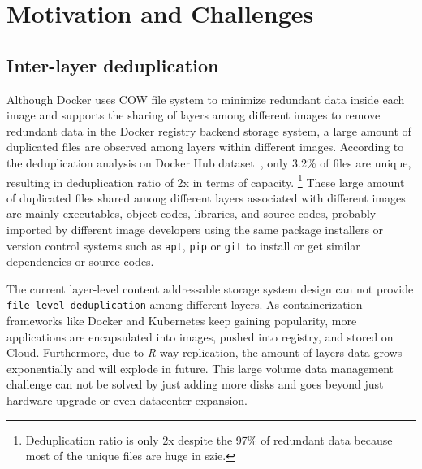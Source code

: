 \section{Motivation and Challenges}
\label{sec:dataset-analysis}

\subsection{Inter-layer deduplication} Although Docker uses COW file system to
minimize redundant data inside each image and supports the sharing of layers
among different images to remove redundant data in the Docker registry backend
storage system, a large amount of duplicated files are observed among layers
within different images. According to the deduplication analysis on Docker Hub
dataset~\cite{dedupanalysis}, only 3.2\% of files are unique, resulting in
deduplication ratio of 2x in terms of capacity.
\footnote{Deduplication ratio is
only 2x despite the 97\% of redundant data because most of the unique files are huge in szie.}
These large amount of
duplicated files shared among different layers associated with different
images are mainly executables, object codes, libraries, and source codes,
probably imported by different image developers using the same package
installers or version control systems such as \texttt{apt}, \texttt{pip} or
\texttt{git} to install or get similar dependencies or source codes.  

The current layer-level content addressable storage system design can not
provide \texttt{file-level deduplication} among different layers.  As containerization
frameworks like Docker and Kubernetes keep gaining popularity, more
applications are encapsulated into images, pushed into registry, and stored on
Cloud. Furthermore, due to \emph{R}-way replication, the amount of layers data
grows exponentially and will explode in future.
This large volume data management challenge can not be solved by just adding
more disks and goes beyond just hardware upgrade or even datacenter expansion.
 
